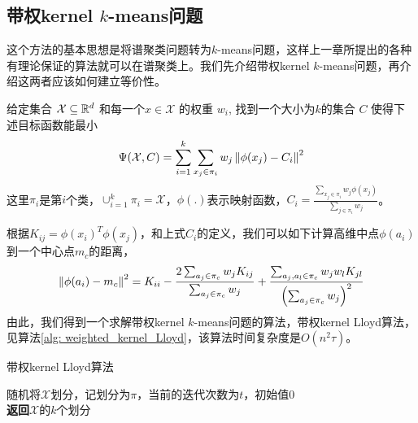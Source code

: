 \subsection{带权kernel \texorpdfstring{$k$}{k}-means问题}
这个方法的基本思想是将谱聚类问题转为$k$-means问题，这样上一章所提出的各种有理论保证的算法就可以在谱聚类上。我们先介绍带权kernel $k$-means问题，再介绍这两者应该如何建立等价性。
\begin{definition}
    \label{def: weighted_kernel_kmeans}
    给定集合 $\mathcal{X} \subseteq \mathbb{R}^d$ 和每一个$x \in \mathcal{X}$ 的权重 $w_i$, 找到一个大小为$k$的集合 $C$ 使得下述目标函数能最小
    \begin{equation*}
        \Psi(\mathcal{X},C) = \sum_{i=1}^k \sum_{x_j \in \pi_i}w_j \left\lVert\phi(x_j)-C_i\right\rVert^2
    \end{equation*}
    这里$\pi_i$是第$i$个类，$\cup_{i=1}^k \pi_i = \mathcal{X}$，$\phi(.)$表示映射函数，$C_i = \frac{\sum_{x_j \in \pi_i}w_j \phi(x_j)}{\sum_{j \in \pi_i}w_j}$。
\end{definition}
根据$K_{ij} = \phi(x_i)^T\phi(x_j)$，和上式$C_i$的定义，我们可以如下计算高维中点$\phi(a_i)$到一个中心点$m_c$的距离，
\begin{equation*}
	\left\lVert\phi(a_i) - m_c\right\rVert^2 = K_{i i}-\frac{2 \sum_{a_{j} \in \pi_{c}} w_{j} K_{i j}}{\sum_{a_{j} \in \pi_{c}} w_{j}}+\frac{\sum_{a_{j}, a_{l} \in \pi_{c}} w_{j} w_{l} K_{j l}}{\left(\sum_{a_{j} \in \pi_{c}} w_{j}\right)^{2}}
\end{equation*}
由此，我们得到一个求解带权kernel $k$-means问题的算法，带权kernel Lloyd算法，见算法\ref{alg: weighted_kernel_Lloyd}，该算法时间复杂度是$O(n^2 \tau)$。
\begin{algorithm}
    \caption{带权kernel Lloyd算法}\label{alg: weighted_kernel_Lloyd}
    随机将$\mathcal{X}$划分，记划分为$\pi$，当前的迭代次数为$t$，初始值0\\
    \textbf{返回}$\mathcal{X}$的$k$个划分
\end{algorithm}
